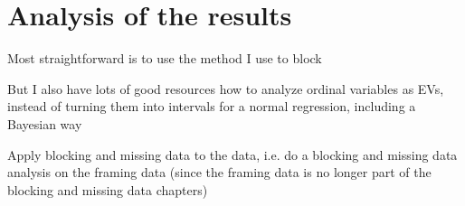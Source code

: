 \section*{Analysis of the results}
	\begin{coi}
		\item Most straightforward is to use the method I use to block
		\item But I also have lots of good resources how to analyze ordinal variables as EVs, instead of turning them into intervals for a normal regression, including a Bayesian way
		\item Apply blocking and missing data to the data, i.e. do a blocking and missing data analysis on the framing data (since the framing data is no longer part of the blocking and missing data chapters)
	\end{coi}
















